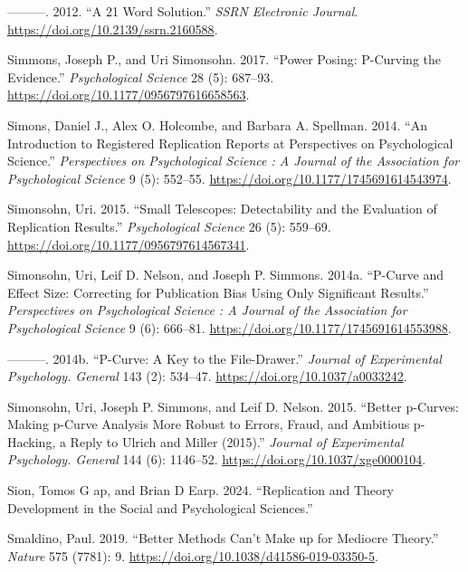 \documentclass[
  letterpaper,
  DIV=11,
  numbers=noendperiod]{scrreprt}
\newlength{\cslhangindent}
\newenvironment{CSLReferences}[2] %
 {\begin{list}{}{%
  \setlength{\itemindent}{0pt}
  \setlength{\leftmargin}{0pt}
  \setlength{\parsep}{0pt}
  \ifodd #1
   \setlength{\leftmargin}{\cslhangindent}
   \setlength{\itemindent}{-1\cslhangindent}
  \fi
  \setlength{\itemsep}{#2\baselineskip}}}
 {\end{list}}
\begin{document}
\begin{CSLReferences}{1}{0}
---------. 2012. {``A 21 Word Solution.''} \emph{SSRN Electronic
Journal}. \url{https://doi.org/10.2139/ssrn.2160588}.

Simmons, Joseph P., and Uri Simonsohn. 2017. {``Power Posing: P-Curving
the Evidence.''} \emph{Psychological Science} 28 (5): 687--93.
\url{https://doi.org/10.1177/0956797616658563}.

Simons, Daniel J., Alex O. Holcombe, and Barbara A. Spellman. 2014.
{``An Introduction to Registered Replication Reports at Perspectives on
Psychological Science.''} \emph{Perspectives on Psychological Science :
A Journal of the Association for Psychological Science} 9 (5): 552--55.
\url{https://doi.org/10.1177/1745691614543974}.

Simonsohn, Uri. 2015. {``Small Telescopes: Detectability and the
Evaluation of Replication Results.''} \emph{Psychological Science} 26
(5): 559--69. \url{https://doi.org/10.1177/0956797614567341}.

Simonsohn, Uri, Leif D. Nelson, and Joseph P. Simmons. 2014a. {``P-Curve
and Effect Size: Correcting for Publication Bias Using Only Significant
Results.''} \emph{Perspectives on Psychological Science : A Journal of
the Association for Psychological Science} 9 (6): 666--81.
\url{https://doi.org/10.1177/1745691614553988}.

---------. 2014b. {``P-Curve: A Key to the File-Drawer.''} \emph{Journal
of Experimental Psychology. General} 143 (2): 534--47.
\url{https://doi.org/10.1037/a0033242}.

Simonsohn, Uri, Joseph P. Simmons, and Leif D. Nelson. 2015. {``Better
p-Curves: Making p-Curve Analysis More Robust to Errors, Fraud, and
Ambitious p-Hacking, a Reply to Ulrich and Miller (2015).''}
\emph{Journal of Experimental Psychology. General} 144 (6): 1146--52.
\url{https://doi.org/10.1037/xge0000104}.

Sion, Tomos G ap, and Brian D Earp. 2024. {``Replication and Theory
Development in the Social and Psychological Sciences.''}

Smaldino, Paul. 2019. {``Better Methods Can't Make up for Mediocre
Theory.''} \emph{Nature} 575 (7781): 9.
\url{https://doi.org/10.1038/d41586-019-03350-5}.


\end{CSLReferences}
\end{document}
